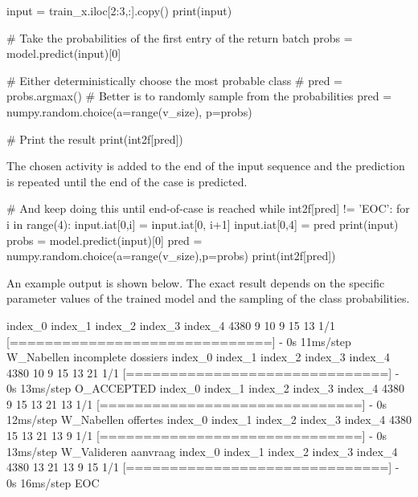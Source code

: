 \begin{samepage}
\begin{pythoncode}
input = train_x.iloc[2:3,:].copy()
print(input)

# Take the probabilities of the first entry of the return batch
probs = model.predict(input)[0]

# Either deterministically choose the most probable class
# pred = probs.argmax()
# Better is to randomly sample from the probabilities
pred = numpy.random.choice(a=range(v_size), p=probs)

# Print the result
print(int2f[pred])
\end{pythoncode}
\end{samepage}

The chosen activity is added to the end of the input sequence and the prediction is repeated until the end of the case is predicted.

\begin{samepage}
\begin{pythoncode}
# And keep doing this until end-of-case is reached
while int2f[pred] != 'EOC':
    for i in range(4):
        input.iat[0,i] = input.iat[0, i+1]
    input.iat[0,4] = pred
    print(input)
    probs = model.predict(input)[0]
    pred = numpy.random.choice(a=range(v_size),p=probs)
    print(int2f[pred])
\end{pythoncode}
\end{samepage}

An example output is shown below. The exact result depends on the specific parameter values of the trained model and the sampling of the class probabilities.

\begin{samepage}
\begin{textcode}
      index_0  index_1  index_2  index_3  index_4
4380        9       10        9       15       13
1/1 [==============================] - 0s 11ms/step
W_Nabellen incomplete dossiers
      index_0  index_1  index_2  index_3  index_4
4380       10        9       15       13       21
1/1 [==============================] - 0s 13ms/step
O_ACCEPTED
      index_0  index_1  index_2  index_3  index_4
4380        9       15       13       21       13
1/1 [==============================] - 0s 12ms/step
W_Nabellen offertes
      index_0  index_1  index_2  index_3  index_4
4380       15       13       21       13        9
1/1 [==============================] - 0s 13ms/step
W_Valideren aanvraag
      index_0  index_1  index_2  index_3  index_4
4380       13       21       13        9       15
1/1 [==============================] - 0s 16ms/step
EOC
\end{textcode}
\end{samepage}

